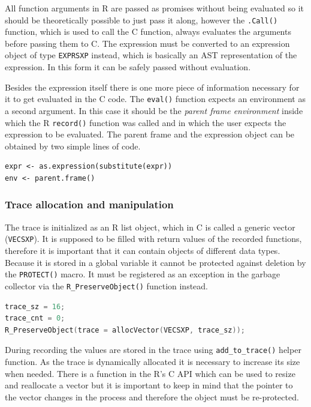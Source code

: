 \documentclass[thesis=M,english,hidelinks]{FITthesis}[2012/10/20]
\begin{document}
			All function arguments in R are passed as promises without being evaluated so it should be theoretically possible to just pass it along, however the \lstinline|.Call()| function, which is used to call the C function, always evaluates the arguments before passing them to C. The expression must be converted to an expression object of type \lstinline|EXPRSXP| instead, which is basically an AST representation of the expression. In this form it can be safely passed without evaluation.\par
			
			Besides the expression itself there is one more piece of information necessary for it to get evaluated in the C code. The \lstinline|eval()| function expects an environment as a second argument. In this case it should be the \emph{parent frame environment} inside which the R \lstinline|record()| function was called and in which the user expects the expression to be evaluated. The parent frame and the expression object can be obtained by two simple lines of code.\par
			
\begin{lstlisting}[style=filestyle, caption={Obtaining the expression and the environment}]
expr <- as.expression(substitute(expr))
env <- parent.frame()
\end{lstlisting}
			
			\subsubsection{Trace allocation and manipulation}
			The trace is initialized as an R list object, which in C is called a generic vector (\lstinline|VECSXP|). It is supposed to be filled with return values of the recorded functions, therefore it is important that it can contain objects of different data types. Because it is stored in a global variable it cannot be protected against deletion by the \lstinline|PROTECT()| macro. It must be registered as an exception in the garbage collector via the \lstinline|R_PreserveObject()| function instead.\par
			
\begin{lstlisting}[style=filestyle, language=C, caption={Initialization of the trace object}]
trace_sz = 16;
trace_cnt = 0;
R_PreserveObject(trace = allocVector(VECSXP, trace_sz));
\end{lstlisting}
			
			During recording the values are stored in the trace using \lstinline|add_to_trace()| helper function. As the trace is dynamically allocated it is necessary to increase its size when needed. There is a function in the R's C API which can be used to resize and reallocate a vector but it is important to keep in mind that the pointer to the vector changes in the process and therefore the object must be re-protected.\par
			
\end{document}
